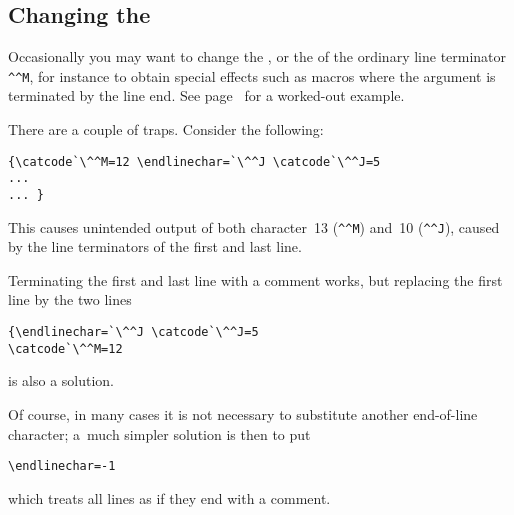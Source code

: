 \documentclass{book}
\begin{document}
\subsection{Changing the }

Occasionally you may want to change the , or
the  of the ordinary line terminator \verb.^^M.,
for instance to obtain special effects such as macros where 
the argument is terminated by the line end.
See page~\pageref{pick:eol} for a worked-out example.

There are  a couple of traps. Consider the following:
\begin{verbatim}
{\catcode`\^^M=12 \endlinechar=`\^^J \catcode`\^^J=5
...
... }
\end{verbatim}
This causes unintended output of both character~13 (\verb-^^M-)
and~10 (\verb-^^J-), caused by the line terminators of the
first and last line.

Terminating the first and  last line with a comment works,
but replacing the first line by the two lines
\begin{verbatim}
{\endlinechar=`\^^J \catcode`\^^J=5
\catcode`\^^M=12
\end{verbatim}
is also a solution.

Of course, in many cases it is not necessary to substitute
another end-of-line character; a~much simpler solution 
is then to put
\begin{verbatim}
\endlinechar=-1 
\end{verbatim}
which treats all lines as if they end with a comment.
\end{document}

